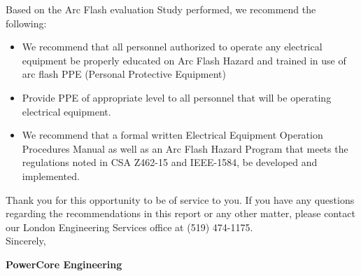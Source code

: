 Based on the Arc Flash evaluation Study performed, we recommend the following:
\begin{itemize}
\item We recommend that all personnel authorized to operate any electrical equipment be properly educated on Arc Flash Hazard and trained  in use of arc flash PPE (Personal Protective Equipment)

\item	Provide PPE of appropriate level to all personnel that will be operating electrical equipment.

\item	We recommend that a formal written Electrical Equipment Operation Procedures Manual as well as an Arc Flash Hazard Program that meets the regulations noted in CSA Z462-15 and IEEE-1584, be developed and implemented.
\end{itemize}
\vspace{10mm}
\noindent Thank you for this opportunity to be of service to you.  If you have any questions regarding the recommendations in this report or any other matter, please contact our London Engineering Services office at (519) 474-1175. \newline
\vspace{5mm}
\\
\noindent Sincerely,\newline

\vspace{5mm}
\noindent\textbf{PowerCore Engineering}\newline

